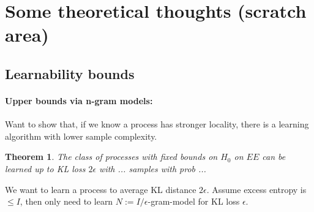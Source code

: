 \documentclass[11pt,letterpaper]{article}
\newcounter{theorem}
\newtheorem{thm}[theorem]{Theorem}
\begin{document}







\section{Some theoretical thoughts (scratch area)}
\subsection{Learnability bounds}

\paragraph{Upper bounds via n-gram models:}
Want to show that, if we know a process has stronger locality, there is a learning algorithm with lower sample complexity.

\begin{thm}
The class of processes with fixed bounds on $H_0$ on $EE$ can be learned up to KL loss $2\epsilon$ with ... samples with prob ...
\end{thm}

We want to learn a process to average KL distance $2\epsilon$.
Assume excess entropy is $\leq I$, then only need to learn $N := I/\epsilon$-gram-model for KL loss $\epsilon$.
\end{document}

